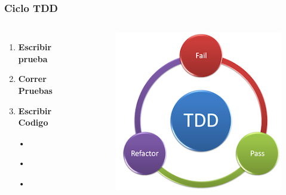 \documentclass{beamer}
\begin{document}
\begin{frame}
\frametitle{Ciclo TDD}
\begin{columns}[c] %

\begin{enumerate}
\item \textbf{Escribir prueba}
\item {\color{red}\textbf{Correr Pruebas}}
\item \textbf{Escribir Codigo}
\item[•]	
\item[•]	
\item[•]	
\end{enumerate}

\begin{figure}
\includegraphics[width=0.9\linewidth]{tdd.png}
\end{figure}
\end{columns}
\end{frame}
\end{document}
